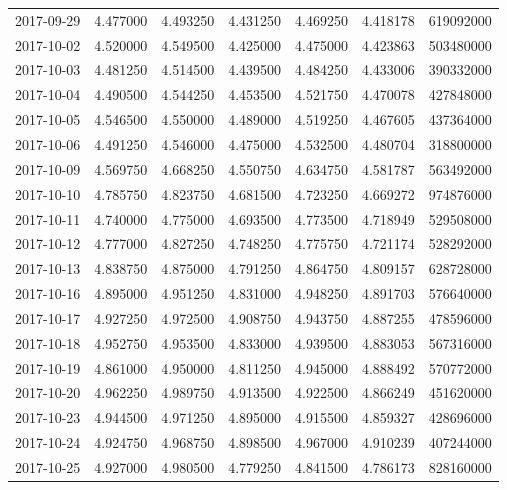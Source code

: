 \begin{tabular}{lrrrrrr}
2017-09-29 &    4.477000 &    4.493250 &    4.431250 &    4.469250 &    4.418178 &   619092000 \\
2017-10-02 &    4.520000 &    4.549500 &    4.425000 &    4.475000 &    4.423863 &   503480000 \\
2017-10-03 &    4.481250 &    4.514500 &    4.439500 &    4.484250 &    4.433006 &   390332000 \\
2017-10-04 &    4.490500 &    4.544250 &    4.453500 &    4.521750 &    4.470078 &   427848000 \\
2017-10-05 &    4.546500 &    4.550000 &    4.489000 &    4.519250 &    4.467605 &   437364000 \\
2017-10-06 &    4.491250 &    4.546000 &    4.475000 &    4.532500 &    4.480704 &   318800000 \\
2017-10-09 &    4.569750 &    4.668250 &    4.550750 &    4.634750 &    4.581787 &   563492000 \\
2017-10-10 &    4.785750 &    4.823750 &    4.681500 &    4.723250 &    4.669272 &   974876000 \\
2017-10-11 &    4.740000 &    4.775000 &    4.693500 &    4.773500 &    4.718949 &   529508000 \\
2017-10-12 &    4.777000 &    4.827250 &    4.748250 &    4.775750 &    4.721174 &   528292000 \\
2017-10-13 &    4.838750 &    4.875000 &    4.791250 &    4.864750 &    4.809157 &   628728000 \\
2017-10-16 &    4.895000 &    4.951250 &    4.831000 &    4.948250 &    4.891703 &   576640000 \\
2017-10-17 &    4.927250 &    4.972500 &    4.908750 &    4.943750 &    4.887255 &   478596000 \\
2017-10-18 &    4.952750 &    4.953500 &    4.833000 &    4.939500 &    4.883053 &   567316000 \\
2017-10-19 &    4.861000 &    4.950000 &    4.811250 &    4.945000 &    4.888492 &   570772000 \\
2017-10-20 &    4.962250 &    4.989750 &    4.913500 &    4.922500 &    4.866249 &   451620000 \\
2017-10-23 &    4.944500 &    4.971250 &    4.895000 &    4.915500 &    4.859327 &   428696000 \\
2017-10-24 &    4.924750 &    4.968750 &    4.898500 &    4.967000 &    4.910239 &   407244000 \\
2017-10-25 &    4.927000 &    4.980500 &    4.779250 &    4.841500 &    4.786173 &   828160000 \\

\end{tabular}
